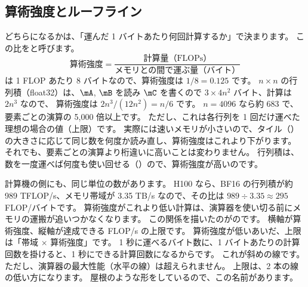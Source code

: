 \subsection*{算術強度とルーフライン}

どちらになるかは、「運んだ 1 バイトあたり何回計算するか」で決まります。
この比をと呼びます。
\begin{equation}
  \text{算術強度} = \frac{\text{計算量（FLOPs）}}{\text{メモリとの間で運ぶ量（バイト）}}
  \label{eq:gpu-intensity}
\end{equation}
 は 1 FLOP あたり 8 バイトなので、算術強度は $1/8=0.125$ です。
$n\times n$ の行列積（float32）は、$\mA$, $\mB$ を読み $\mC$ を書くので $3\times4n^2$ バイト、計算は $2n^3$ なので、
算術強度は $2n^3/(12n^2)=n/6$ です。
$n=4096$ なら約 683 で、要素ごとの演算の 5,000 倍以上です。
ただし、これは各行列を 1 回だけ運べた理想の場合の値（上限）です。
実際には速いメモリが小さいので、タイル（）の大きさに応じて同じ数を何度か読み直し、算術強度はこれより下がります。
それでも、要素ごとの演算より桁違いに高いことは変わりません。
行列積は、数を一度運べば何度も使い回せる（）ので、算術強度が高いのです。

計算機の側にも、同じ単位の数があります。
H100 なら、BF16 の行列積が約 989 TFLOP/s、メモリ帯域が 3.35 TB/s なので、その比は $989\div3.35\approx295$ FLOP/バイトです。
算術強度がこれより低い計算は、演算器を使い切る前にメモリの運搬が追いつかなくなります。
この関係を描いたのがのです。
横軸が算術強度、縦軸が達成できる FLOP/s の上限です。
算術強度が低いあいだ、上限は「帯域 $\times$ 算術強度」です。
1 秒に運べるバイト数に、1 バイトあたりの計算回数を掛けると、1 秒にできる計算回数になるからです。
これが斜めの線です。
ただし、演算器の最大性能（水平の線）は超えられません。
上限は、2 本の線の低い方になります。
屋根のような形をしているので、この名前があります。

